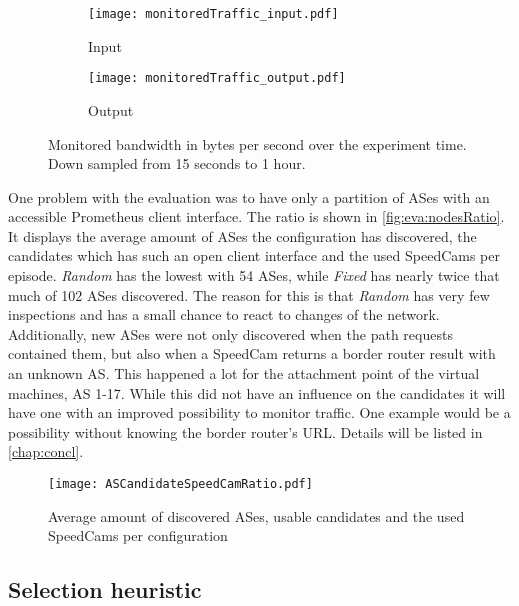 \documentclass[thesis.tex]{subfiles}
\begin{document}
\begin{figure}[h]
	\centering
	\begin{subfigure}{.8\linewidth}
		\centering
		\texttt{[image: monitoredTraffic\_input.pdf]}
		\caption{Input}
		\label{fig:eva:monitoredTraffic:input}
	\end{subfigure}
	\hfill
	\begin{subfigure}{0.8\linewidth}
		\centering
		\texttt{[image: monitoredTraffic\_output.pdf]}
		\caption{Output}
		\label{fig:eva:monitoredTraffic:output}
	\end{subfigure}
	\caption{Monitored bandwidth in bytes per second over the experiment time. Down sampled from 15 seconds to 1 hour.}
	\label{fig:eva:monitoredTraffic}
\end{figure}

One problem with the evaluation was to have only a partition of ASes with an accessible Prometheus client interface. The ratio is shown in \autoref{fig:eva:nodesRatio}. It displays the average amount of ASes the configuration has discovered, the candidates which has such an open client interface and the used SpeedCams per episode. \textit{Random} has the lowest with 54 ASes, while \textit{Fixed} has nearly twice that much of 102 ASes discovered. The reason for this is that \textit{Random} has very few inspections and has a small chance to react to changes of the network. Additionally, new ASes were not only discovered when the path requests contained them, but also when a SpeedCam returns a border router result with an unknown AS. This happened a lot for the attachment point of the virtual machines, AS 1-17. While this did not have an influence on the candidates it will have one with an improved possibility to monitor traffic. One example would be a possibility without knowing the border router's URL. Details will be listed in \autoref{chap:concl}.

\begin{figure}[h]
	\centering
	\texttt{[image: ASCandidateSpeedCamRatio.pdf]}
	\caption{Average amount of discovered ASes, usable candidates and the used SpeedCams per configuration}
	\label{fig:eva:nodesRatio}
\end{figure}

\subsection{Selection heuristic} \label{sec:eva:selectionHeuristic}
\end{document}
